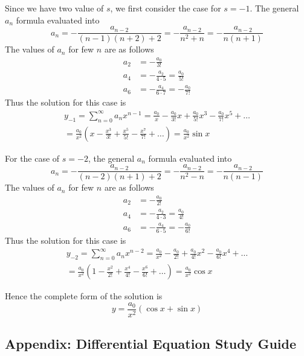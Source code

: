 \documentclass[../../main.tex]{subfiles}
\begin{document}
Since we have two value of $s$, we first consider the case for $s=-1$. The general $a_n$ formula evaluated into 
\begin{equation*}
  a_n=-\frac{a_{n-2}}{(n-1)(n+2)+2}=-\frac{a_{n-2}}{n^2+n}=-\frac{a_{n-2}}{n(n+1)}
\end{equation*}
The values of $a_n$ for few $n$ are as follows 
\begin{align*}
  a_2&=-\frac{a_0}{3!}\\
  a_4&=-\frac{a_2}{4\cdot 5}=\frac{a_0}{5!}\\
  a_6&=-\frac{a_4}{6\cdot7}=-\frac{a_0}{7!}
\end{align*}
Thus the solution for this case is 
\begin{multline*}
  y_{-1}=\sum_{n=0}^{\infty} a_nx^{n-1}=\frac{a_0}{x}-\frac{a_0}{3!}x+\frac{a_0}{5!}x^3-\frac{a_0}{7!}x^5 +\dots\\
  =\frac{a_0}{x^2}\left(x-\frac{x^3}{3!}+\frac{x^5}{5!}-\frac{x^7}{7!}+\dots\right)=\frac{a_0}{x^2}\sin x
\end{multline*}

For the case of $s=-2$, the general $a_n$ formula evaluated into
\begin{equation*}
  a_n=-\frac{a_{n-2}}{(n-2)(n+1)+2}=-\frac{a_{n-2}}{n^2-n}=-\frac{a_{n-2}}{n(n-1)}
\end{equation*}
The values of $a_n$ for few $n$ are as follows 
\begin{align*}
  a_2&=-\frac{a_0}{2!}\\
  a_4&=-\frac{a_2}{4\cdot 3}=\frac{a_0}{4!}\\
  a_6&=-\frac{a_4}{6\cdot 5}=-\frac{a_0}{6!}
\end{align*}
Thus the solution for this case is 
\begin{multline*}
  y_{-2}=\sum_{n=0}^{\infty} a_nx^{n-2}= \frac{a_0}{x^2}-\frac{a_0}{2!}+\frac{a_0}{4!}x^2-\frac{a_0}{6!}x^4 +\dots\\
  =\frac{a_0}{x^2}\left(1-\frac{x^2}{2!}+\frac{x^4}{4!}-\frac{x^6}{6!}+\dots\right)=\frac{a_0}{x^2}\cos x
\end{multline*}

Hence the complete form of the solution is 
\begin{equation*}
  y=\frac{a_0}{x^2}\left(\cos x +\sin x\right)
\end{equation*}

\subsection*{Appendix: Differential Equation Study Guide}
\end{document}

